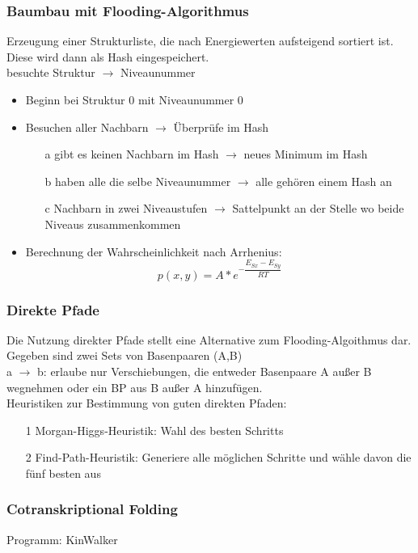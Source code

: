 \subsubsection{Baumbau mit Flooding-Algorithmus}
Erzeugung einer Strukturliste, die nach Energiewerten aufsteigend sortiert ist. Diese wird dann als Hash eingespeichert.\\
besuchte Struktur $\rightarrow$ Niveaunummer
\begin{itemize}
\item Beginn bei Struktur 0 mit Niveaunummer 0
\item Besuchen aller Nachbarn $\rightarrow$ Überprüfe im Hash
\begin{itemize}
\item[a] gibt es keinen Nachbarn im Hash $\rightarrow$ neues Minimum im Hash 
\item[b] haben alle die selbe Niveaunummer $\rightarrow$ alle gehören einem Hash an
\item[c] Nachbarn in zwei Niveaustufen $\rightarrow$ Sattelpunkt an der Stelle wo beide Niveaus zusammenkommen
\end{itemize}
\item Berechnung der Wahrscheinlichkeit nach Arrhenius:
\begin{equation}
p(x,y) = A*e^{-\dfrac{E_{Sx}-E_{Sy}}{RT}}
\end{equation}
\end{itemize}

\subsubsection{Direkte Pfade}
Die Nutzung direkter Pfade stellt eine Alternative zum Flooding-Algoithmus dar.\\
Gegeben sind zwei Sets von Basenpaaren (A,B)\\
a $\rightarrow$ b: erlaube nur Verschiebungen, die entweder Basenpaare A außer B wegnehmen oder ein BP aus B außer A hinzufügen. \\
Heuristiken zur Bestimmung von guten direkten Pfaden:
\begin{itemize}
\item[1] Morgan-Higgs-Heuristik: Wahl des besten Schritts
\item[2] Find-Path-Heuristik: Generiere alle möglichen Schritte und wähle davon die fünf besten aus
\end{itemize}

\subsubsection{Cotranskriptional Folding}
Programm: KinWalker \\

